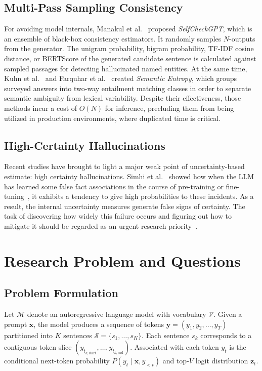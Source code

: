 \documentclass[conference]{IEEEtran}
\begin{document}
\subsection{Multi-Pass Sampling Consistency}
For avoiding model internals, Manakul et al.~\cite{manakul2023selfcheckgpt} proposed \textit{SelfCheckGPT}, which is an ensemble of black-box consistency estimators. It randomly samples $N$-outputs from the generator. The unigram probability, bigram probability, TF-IDF cosine distance, or BERTScore of the generated candidate sentence is calculated against sampled passages for detecting hallucinated named entities. At the same time, Kuhn et al.~\cite{kuhn2023semantic} and Farquhar et al.~\cite{farquhar2024detecting} created \textit{Semantic Entropy}, which groups surveyed answers into two-way entailment matching classes in order to separate semantic ambiguity from lexical variability. Despite their effectiveness, those methods incur a cost of $O(N)$ for inference, precluding them from being utilized in production environments, where duplicated time is critical.

\subsection{High-Certainty Hallucinations}
Recent studies have brought to light a major weak point of uncertainty-based estimate: high certainty hallucinations. Simhi et al.~\cite{simhi2024high}  showed how when the LLM has learned some false fact associations in the course of pre-training or fine-tuning~\cite{gekhman2024does},  it exhibits a tendency to give high probabilities to these incidents. As a result, the internal uncertainty measures generate false signs of certainty. The task of discovering how widely this failure occurs and figuring out how to mitigate it should be regarded as an urgent research priority~\cite{rajhans2025token}.

\section{Research Problem and Questions}
\subsection{Problem Formulation}
Let $\mathcal{M}$ denote an autoregressive language model with vocabulary $\mathcal{V}$. Given a prompt $\mathbf{x}$, the model produces a sequence of tokens $\mathbf{y} = (y_1, y_2, \dots, y_T)$ partitioned into $K$ sentences $\mathcal{S} = \{s_1, \dots, s_K\}$. Each sentence $s_k$ corresponds to a contiguous token slice $(y_{t_{k, \text{start}}}, \dots, y_{t_{k, \text{end}}})$. Associated with each token $y_t$ is the conditional next-token probability $P(y_t \mid \mathbf{x}, y_{<t})$ and top-$V$ logit distribution $\mathbf{z}_t$.
\end{document}
